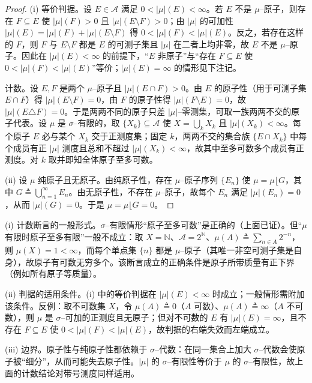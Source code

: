 \documentclass[../../main.tex]{subfiles}%
\begin{document}
\begin{proof}
(i) 等价判据。设 $E\in\mathcal{A}$ 满足 $0<|\mu|(E)<\infty$。若 $E$ 不是 $\mu$--原子，则存在 $F\subseteq E$ 使 $|\mu|(F)>0$ 且 $|\mu|(E\setminus F)>0$；由 $|\mu|$ 的可加性 $|\mu|(E)=|\mu|(F)+|\mu|(E\setminus F)$ 得 $0<|\mu|(F)<|\mu|(E)$。反之，若存在这样的 $F$，则 $F$ 与 $E\setminus F$ 都是 $E$ 的可测子集且 $|\mu|$ 在二者上均非零，故 $E$ 不是 $\mu$--原子。因此在 $|\mu|(E)<\infty$ 的前提下，“$E$ 非原子”与“存在 $F\subseteq E$ 使 $0<|\mu|(F)<|\mu|(E)$”等价；$|\mu|(E)=\infty$ 的情形见下注记。

计数。设 $E,F$ 是两个 $\mu$--原子且 $|\mu|(E\cap F)>0$。由 $E$ 的原子性（用于可测子集 $E\cap F$）得 $|\mu|(E\setminus F)=0$，由 $F$ 的原子性得 $|\mu|(F\setminus E)=0$，故 $|\mu|(E\triangle F)=0$。于是两两不同的原子只差 $|\mu|$--零测集，可取一族两两不交的原子代表。设 $\mu$ 是 $\sigma$--有限的，取 $\{X_k\}\subseteq\mathcal{A}$ 使 $X=\bigcup_k X_k$ 且 $|\mu|(X_k)<\infty$。每个原子 $E$ 必与某个 $X_k$ 交于正测度集；固定 $k$，两两不交的集合族 $\{E\cap X_k\}$ 中每个成员有正 $|\mu|$ 测度且总和不超过 $|\mu|(X_k)<\infty$，故其中至多可数多个成员有正测度。对 $k$ 取并即知全体原子至多可数。

(ii) 设 $\mu$ 纯原子且无原子。由纯原子性，存在 $\mu$--原子序列 $\{E_n\}$ 使 $\mu=\mu\lfloor G$，其中 $G\triangleq\bigcup_{n=1}^\infty E_n$。由无原子性，不存在 $\mu$--原子，故每个 $E_n$ 满足 $|\mu|(E_n)=0$，从而 $|\mu|(G)=0$。于是 $\mu=\mu\lfloor G=0$。
\end{proof}

\begin{remark}\label{remark:ch01-原子计数修正}
(i) 计数断言的一般形式。$\sigma$--有限情形“原子至多可数”是正确的（上面已证）。但“$\mu$ 有限时原子至多有限”一般不成立：取 $X=\mathbb{N}$、$\mathcal{A}=2^{\mathbb{N}}$、$\mu(A)\triangleq\sum_{n\in A}2^{-n}$，则 $\mu(X)=1<\infty$，而每个单点集 $\{n\}$ 都是 $\mu$--原子（其唯一非空可测子集是自身），故原子有可数无穷多个。该断言成立的正确条件是原子所带质量有正下界（例如所有原子等质量）。

(ii) 判据的适用条件。(i) 中的等价判据在 $|\mu|(E)<\infty$ 时成立；一般情形需附加该条件。反例：取不可数集 $X$，令 $\mu(A)\triangleq0$（$A$ 可数）、$\mu(A)\triangleq\infty$（$A$ 不可数），则 $\mu$ 是 $\sigma$--可加的正测度且无原子；但对不可数的 $E$ 有 $|\mu|(E)=\infty$，且不存在 $F\subseteq E$ 使 $0<|\mu|(F)<|\mu|(E)$，故判据的右端失效而左端成立。

(iii) 边界。原子性与纯原子性都依赖于 $\sigma$--代数：在同一集合上加大 $\sigma$--代数会使原子被“细分”，从而可能失去原子性。$|\mu|$ 的 $\sigma$--有限性等价于 $\mu$ 的 $\sigma$--有限性，故上面的计数结论对带号测度同样适用。
\end{remark}
\end{document}
